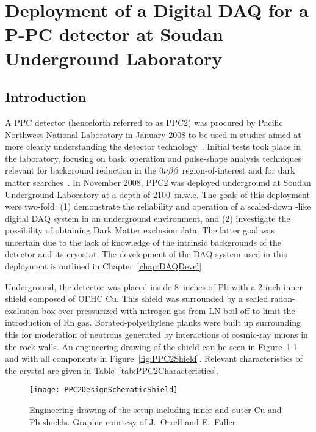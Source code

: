 
\chapter{Deployment of a Digital DAQ for a P-PC detector at Soudan Underground Laboratory}
\label{chap:DeploymentPPC2Soudan}
	\section{Introduction}
	\label{sec:DeploymentPPC2SoudanIntro}
			
		A PPC detector (henceforth referred to as PPC2) was procured by Pacific Northwest National Laboratory in January 2008 to be used in studies aimed at more clearly understanding the detector technology~\cite{Orr2007}.  Initial tests took place in the laboratory, focusing on basic operation and pulse-shape analysis techniques relevant for background reduction in the $0 \nu \beta \beta$ region-of-interest and for dark matter searches~\cite{Orr2008}.  In November 2008, PPC2 was deployed underground at Soudan Underground Laboratory at a depth of 2100~m.w.e.  The goals of this deployment were two-fold: (1) demonstrate the reliability and operation of a scaled-down \MJ-like digital DAQ system in an underground environment, and (2) investigate the possibility of obtaining Dark Matter exclusion data.  The latter goal was uncertain due to the lack of knowledge of the intrinsic backgrounds of the detector and its cryostat.  The development of the DAQ system used in this deployment is outlined in Chapter~\ref{chap:DAQDevel}
		
		Underground, the detector was placed inside 8~inches of Pb with a 2-inch inner shield composed of OFHC Cu.  This shield was surrounded by a sealed radon-exclusion box over pressurized with nitrogen gas from LN boil-off to limit the introduction of Rn gas.  Borated-polyethylene planks were built up surrounding this for moderation of neutrons generated by interactions of cosmic-ray muons in the rock walls.  An engineering drawing of the shield can be seen in Figure~\ref{fig:PPC2OnlyShield} and with all components in Figure~\ref{fig:PPC2Shield}.  Relevant characteristics of the crystal are given in Table~\ref{tab:PPC2Characteristics}.
	
			\begin{figure}
				\centering
				\texttt{[image: PPC2DesignSchematicShield]}
				\caption[Engineering drawing of PPC2 deployment]
				{Engineering drawing of the setup including inner and outer Cu and Pb shields.
				Graphic courtesy of J.~Orrell and E.~Fuller.}
				\label{fig:PPC2OnlyShield}
			\end{figure}
	
